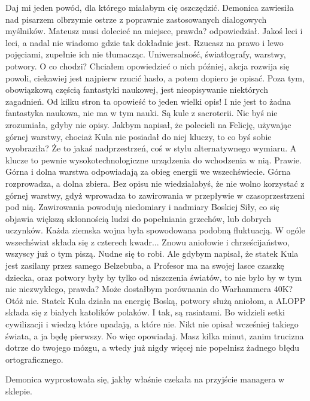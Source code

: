 \begin{dialogue}
\ds{} Daj mi jeden powód, dla którego miałabym cię oszczędzić. \dm{} Demonica zawiesiła nad pisarzem olbrzymie ostrze z poprawnie zastosowanych dialogowych myślników.
\ds{} Mateusz musi dolecieć na miejsce, prawda? \dm{} odpowiedział.
\ds{} Jakoś leci i leci, a nadal nie wiadomo gdzie tak dokładnie jest. Rzucasz na prawo i lewo pojęciami, zupełnie ich nie tłumacząc.
Uniwersalność, światłografy, warstwy, potwory. O co chodzi?
\ds{} Chciałem opowiedzieć o nich później, akcja rozwija się powoli, ciekawiej jest najpierw rzucić hasło, a potem dopiero je opisać.
Poza tym, obowiązkową częścią fantastyki naukowej, jest nieopisywanie niektórych zagadnień.
\ds{} Od kilku stron ta opowieść to jeden wielki opis! I nie jest to żadna fantastyka naukowa, nie ma w tym nauki. Są kule z sacroterii.
\ds{} Nic byś nie zrozumiała, gdyby nie opisy. Jakbym napisał, że polecieli na Felicję, używając górnej warstwy, chociaż Kula nie posiadał do niej kluczy, to co byś sobie wyobraziła?
\ds{} Że to jakaś nadprzestrzeń, coś w stylu alternatywnego wymiaru. A klucze to pewnie wysokotechnologiczne urządzenia do wchodzenia w nią.
\ds{} Prawie. Górna i dolna warstwa odpowiadają za obieg energii we wszechświecie. Górna rozprowadza, a dolna zbiera.
Bez opisu nie wiedziałabyś, że nie wolno korzystać z górnej warstwy, gdyż wprowadza to zawirowania w przepływie w czasoprzestrzeni pod nią.
Zawirowania powodują niedomiary i nadmiary Boskiej Siły, co się objawia większą skłonnością ludzi do popełniania grzechów, lub dobrych uczynków.
Każda ziemska wojna była spowodowana podobną fluktuacją.
W ogóle wszechświat składa się z czterech kwadr...
\ds{} Znowu aniołowie i chrześcijaństwo, wszyscy już o tym piszą. Nudne się to robi.
\ds{} Ale gdybym napisał, że statek Kula jest zasilany przez samego Belzebuba, a Profesor ma na swojej lasce czaszkę dziecka, oraz potwory były by tylko od niszczenia światów, to nie było by w tym nic niezwykłego, prawda? Może dostałbym porównania do Warhammera 40K? Otóż nie. Statek Kula działa na energię Boską, potwory służą aniołom, a ALOPP składa się z białych katolików polaków. 
I tak, są rasiatami. Bo widzieli setki cywilizacji i wiedzą które upadają, a które nie.
Nikt nie opisał wcześniej takiego świata, a ja będę pierwszy.
\ds{} No więc opowiadaj. Masz kilka minut, zanim trucizna dotrze do twojego mózgu, a wtedy już nigdy więcej nie popełnisz żadnego błędu ortograficznego.
\end{dialogue}
Demonica wyprostowała się, jakby właśnie czekała na przyjście managera w sklepie.

